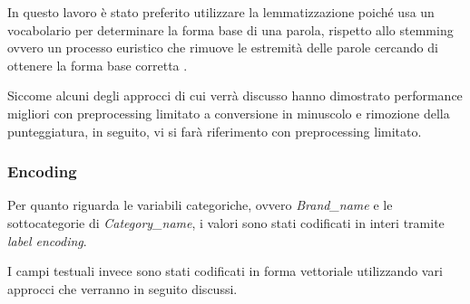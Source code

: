 In questo lavoro è stato preferito utilizzare la lemmatizzazione poiché usa un
vocabolario per determinare la forma base di una parola, rispetto allo stemming
ovvero un processo euristico che rimuove le estremità delle parole cercando di
ottenere la forma base corretta \cite{balakrishnan2014stemming}. 

Siccome alcuni degli approcci di cui verrà discusso hanno dimostrato performance
migliori con preprocessing limitato a conversione in minuscolo e rimozione della
punteggiatura, in seguito, vi si farà riferimento con preprocessing limitato.

\subsubsection{Encoding}

Per quanto riguarda le variabili categoriche, ovvero \textit{Brand\_name} e le
sottocategorie di \textit{Category\_name},
i valori sono stati codificati in interi tramite \textit{label encoding}.

I campi testuali invece sono stati codificati in forma vettoriale utilizzando
vari approcci che verranno in seguito discussi.


